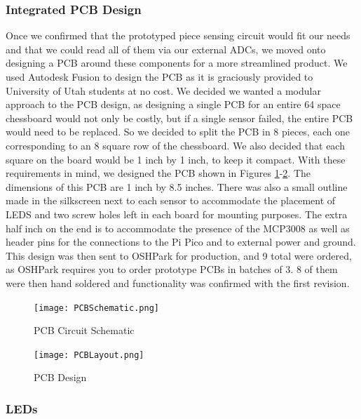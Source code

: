 \documentclass[11pt,journal]{IEEEtran}
\begin{document}
\subsubsection{Integrated PCB Design}
Once we confirmed that the prototyped piece sensing circuit would fit our needs and that we could read all of them via our external ADCs, we moved onto designing a PCB around these components for a more streamlined product. We used Autodesk Fusion to design the PCB as it is graciously provided to University of Utah students at no cost. We decided we wanted a modular approach to the PCB design, as designing a single PCB for an entire 64 space chessboard would not only be costly, but if a single sensor failed, the entire PCB would need to be replaced. So we decided to split the PCB in 8 pieces, each one corresponding to an 8 square row of the chessboard. We also decided that each square on the board would be 1 inch by 1 inch, to keep it compact. With these requirements in mind, we designed the PCB shown in Figures \ref{pcbschematic}-\ref{pcbdesign}. The dimensions of this PCB are 1 inch by 8.5 inches. There was also a small outline made in the silkscreen next to each sensor to accommodate the placement of LEDS and two screw holes left in each board for mounting purposes. The extra half inch on the end is to accommodate the presence of the MCP3008 as well as header pins for the connections to the Pi Pico and to external power and ground. This design was then sent to OSHPark for production, and 9 total were ordered, as OSHPark requires you to order prototype PCBs in batches of 3. 8 of them were then hand soldered and functionality was confirmed with the first revision.
\begin{figure}[ht]
  \texttt{[image: PCBSchematic.png]}
  \caption{PCB Circuit Schematic}
  \label{pcbschematic}
\end{figure}
\begin{figure}[ht]
  \texttt{[image: PCBLayout.png]}
  \caption{PCB Design}
  \label{pcbdesign}
\end{figure}
\subsubsection{LEDs}
\end{document}
